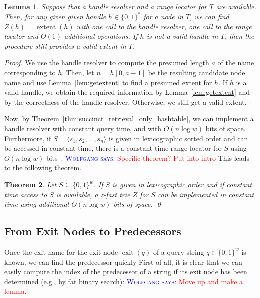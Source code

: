 \documentclass[a4paper,11pt]{article}
\newtheorem{theorem} {Theorem}[section]
\newtheorem{lemma}[theorem]{Lemma}
\newcommand{\?}{\mskip1.5mu}
\DeclareMathOperator{\exit}{exit}
\DeclareMathOperator{\extent}{extent}
\newcommand{\aremark}[3]{\textcolor{blue}{\textsc{#1 #2:}}
  \textcolor{red}{\textsf{#3}}}
\newcommand{\wolfgang}[2][says]{\aremark{Wolfgang}{#1}{#2}}
\begin{document}
\begin{lemma}\label{lem:implementz}
Suppose that a handle resolver and a range locator for $T$ are 
available. Then, for any given given handle $h \in \{0, 1\}^*$ for 
a node in $T$, we can
find $Z(h) = \extent(h)$ with one call to the handle resolver, one
call to the range locator and $O(1)$
additional operations.  If $h$ is not a valid handle in $T$, then
the procedure still provides a valid extent in $T$.
\end{lemma}

\begin{proof}
We use the handle resolver to compute the presumed length
$a$ of the name corresponding to $h$.
Then, let $n = h[0, a - 1]$ be the resulting
candidate node name and use Lemma~\ref{lem:getextent}
to find a presumed extent for $h$.
If $h$ is a valid handle, we obtain the required information by
Lemma~\ref{lem:getextent} and by the correctness of the handle 
resolver. Otherwise, we still get a valid extent.
\end{proof}

Now, by Theorem~\ref{thm:succinct_retrieval_only_hashtable},
we can implement a handle resolver with constant 
query time, and with $O(n \log w)$ bits of 
space.  Furthermore, if $S = \langle s_1, s_2, \dots, s_n\rangle$ 
is given in lexicographic sorted order and can be accessed in
constant time,
there is a constant-time range locator for $S$ using $O(n\log w)$
bits~\cite{BelazzouguiBoPaVi09}.
\wolfgang{Specific theorem? Put into intro}
This leads to the following theorem.

\begin{theorem}
\label{th:zfast}
Let $S \subseteq \{0, 1\}^w$.
If $S$ is given in lexicographic order and if constant time
access to $S$ is available, a z-fast trie $Z$ for $S$ can be
implemented in constant time using additional $O(n\log w)$ bits of space.
\qed
\end{theorem}

\subsection{From Exit Nodes to Predecessors}

Once the exit name for the exit node $\exit(q)$ of a query 
string $q \in \{0, 1\}^w$ is known, we can find the predecessor quickly
First of all, it is clear that we can easily compute the index of 
the predecessor of a string if its exit node has been determined 
(e.g., by fat binary search): 
\wolfgang{Move up and make a lemma.}
\end{document}
